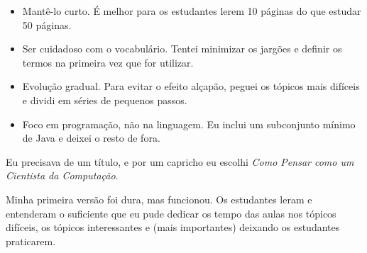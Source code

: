 \begin{itemize}

\item Mantê-lo curto. É melhor para os estudantes lerem 10 páginas do que 
	estudar 50 páginas.


\item Ser cuidadoso com o vocabulário. Tentei minimizar os jargões e definir 
	os termos na primeira vez que for utilizar.


\item Evolução gradual. Para evitar o efeito alçapão, peguei os tópicos mais 
	difíceis e dividi em séries de pequenos passos.


\item Foco em programação, não na linguagem. Eu inclui um subconjunto mínimo 
	de Java e deixei o resto de fora.
\end{itemize}


Eu precisava de um título, e por um capricho eu escolhi \emph{Como Pensar como 
um Cientista da Computação}.


Minha primeira versão foi dura, mas funcionou. Os estudantes leram e 
entenderam o suficiente que eu pude dedicar os tempo das aulas nos tópicos 
difíceis, os tópicos interessantes e (mais importantes) deixando os 
estudantes praticarem.


